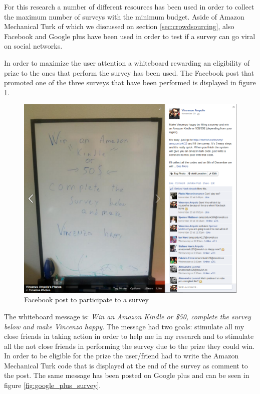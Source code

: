 For this research a number of different resources has been used in order to collect the maximum number of surveys with the minimum budget. Aside of Amazon Mechanical Turk of which we discussed on section \ref{sec:crowdsourcing}, also Facebook and Google plus have been used in order to test if a survey can go viral on social networks.

In order to maximize the user attention a whiteboard rewarding an eligibility of prize to the ones that perform the survey has been used. The Facebook post that promoted one of the three surveys that have been performed is displayed in figure \ref{fig:facebook_survey}.

\begin{figure}
  \centering
  \includegraphics[width=\textwidth]{figures/facebook_survey.png}
  \caption{Facebook post to participate to a survey}
  \label{fig:facebook_survey}
\end{figure}

The whiteboard message is: \textit{Win an Amazon Kindle or \$50, complete the survey below and make Vincenzo happy}. The message had two goals: stimulate all my close friends in taking action in order to help me in my research and to stimulate all the not close friends in performing the survey due to the prize they could win. In order to be eligible for the prize the user/friend had to write the Amazon Mechanical Turk code that is displayed at the end of the survey as comment to the post.  The same message has been posted on Google plus and can be seen in figure \ref{fig:google_plus_survey}.

